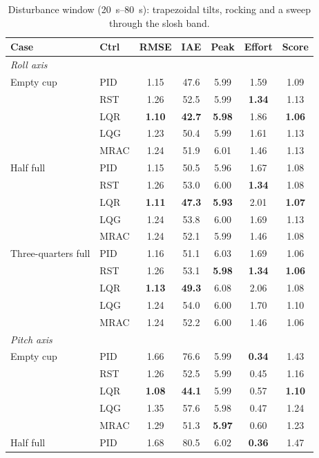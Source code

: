 \begin{table}[!ht]
\centering
\caption{Disturbance window (\SIrange{20}{80}{\second}): trapezoidal tilts, rocking and a sweep through the slosh band.}
\label{tab:dist}
\footnotesize
\setlength{\tabcolsep}{3pt}
\begin{tabular}{llccccc}
\toprule
Case & Ctrl & RMSE & IAE & Peak & Effort & Score \\
\midrule
\multicolumn{7}{l}{\textit{Roll axis}} \\
Empty cup & PID & 1.15 & 47.6 & 5.99 & 1.59 & 1.09 \\
 & RST & 1.26 & 52.5 & 5.99 & \textbf{1.34} & 1.13 \\
 & LQR & \textbf{1.10} & \textbf{42.7} & \textbf{5.98} & 1.86 & \textbf{1.06} \\
 & LQG & 1.23 & 50.4 & 5.99 & 1.61 & 1.13 \\
 & MRAC & 1.24 & 51.9 & 6.01 & 1.46 & 1.13 \\
\addlinespace[2pt]
Half full & PID & 1.15 & 50.5 & 5.96 & 1.67 & 1.08 \\
 & RST & 1.26 & 53.0 & 6.00 & \textbf{1.34} & 1.08 \\
 & LQR & \textbf{1.11} & \textbf{47.3} & \textbf{5.93} & 2.01 & \textbf{1.07} \\
 & LQG & 1.24 & 53.8 & 6.00 & 1.69 & 1.13 \\
 & MRAC & 1.24 & 52.1 & 5.99 & 1.46 & 1.08 \\
\addlinespace[2pt]
Three-quarters full & PID & 1.16 & 51.1 & 6.03 & 1.69 & 1.06 \\
 & RST & 1.26 & 53.1 & \textbf{5.98} & \textbf{1.34} & \textbf{1.06} \\
 & LQR & \textbf{1.13} & \textbf{49.3} & 6.08 & 2.06 & 1.08 \\
 & LQG & 1.24 & 54.0 & 6.00 & 1.70 & 1.10 \\
 & MRAC & 1.24 & 52.2 & 6.00 & 1.46 & 1.06 \\
\midrule
\multicolumn{7}{l}{\textit{Pitch axis}} \\
Empty cup & PID & 1.66 & 76.6 & 5.99 & \textbf{0.34} & 1.43 \\
 & RST & 1.26 & 52.5 & 5.99 & 0.45 & 1.16 \\
 & LQR & \textbf{1.08} & \textbf{44.1} & 5.99 & 0.57 & \textbf{1.10} \\
 & LQG & 1.35 & 57.6 & 5.98 & 0.47 & 1.24 \\
 & MRAC & 1.29 & 51.3 & \textbf{5.97} & 0.60 & 1.23 \\
\addlinespace[2pt]
Half full & PID & 1.68 & 80.5 & 6.02 & \textbf{0.36} & 1.47 \\

\end{tabular}
\end{table}
